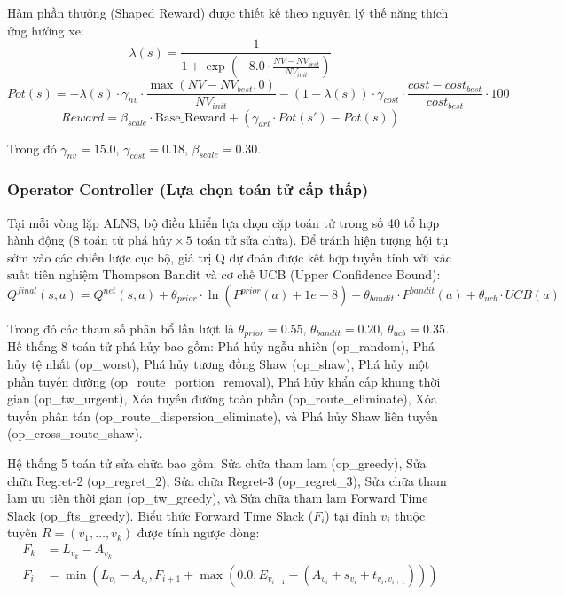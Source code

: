 \documentclass[13pt,a4paper]{extarticle}
\begin{document}
Hàm phần thưởng (Shaped Reward) được thiết kế theo nguyên lý thế năng thích ứng hướng xe:
\begin{equation}
\lambda(s) = \frac{1}{1 + \exp\left(-8.0 \cdot \frac{NV - NV_{best}}{NV_{init}}\right)}
\end{equation}
\begin{equation}
Pot(s) = - \lambda(s) \cdot \gamma_{nv} \cdot \frac{\max(NV - NV_{best}, 0)}{NV_{init}} - (1 - \lambda(s)) \cdot \gamma_{cost} \cdot \frac{cost - cost_{best}}{cost_{best}} \cdot 100
\end{equation}
\begin{equation}
Reward = \beta_{scale} \cdot \text{Base\_Reward} + \left( \gamma_{drl} \cdot Pot(s') - Pot(s) \right)
\end{equation}

Trong đó $\gamma_{nv} = 15.0$, $\gamma_{cost} = 0.18$, $\beta_{scale} = 0.30$.

\subsubsection{Operator Controller (Lựa chọn toán tử cấp thấp)}

Tại mỗi vòng lặp ALNS, bộ điều khiển lựa chọn cặp toán tử trong số 40 tổ hợp hành động ($8 \text{ toán tử phá hủy} \times 5 \text{ toán tử sửa chữa}$). Để tránh hiện tượng hội tụ sớm vào các chiến lược cục bộ, giá trị Q dự đoán được kết hợp tuyến tính với xác suất tiên nghiệm Thompson Bandit và cơ chế UCB (Upper Confidence Bound):
\begin{equation}
Q^{final}(s, a) = Q^{net}(s, a) + \theta_{prior} \cdot \ln(P^{prior}(a) + 1e-8) + \theta_{bandit} \cdot P^{bandit}(a) + \theta_{ucb} \cdot UCB(a)
\end{equation}

Trong đó các tham số phân bổ lần lượt là $\theta_{prior} = 0.55$, $\theta_{bandit} = 0.20$, $\theta_{ucb} = 0.35$.
Hế thống 8 toán tử phá hủy bao gồm: Phá hủy ngẫu nhiên (op\_random), Phá hủy tệ nhất (op\_worst), Phá hủy tương đồng Shaw (op\_shaw), Phá hủy một phần tuyến đường (op\_route\_portion\_removal), Phá hủy khẩn cấp khung thời gian (op\_tw\_urgent), Xóa tuyến đường toàn phần (op\_route\_eliminate), Xóa tuyến phân tán (op\_route\_dispersion\_eliminate), và Phá hủy Shaw liên tuyến (op\_cross\_route\_shaw).
\clearpage

Hệ thống 5 toán tử sửa chữa bao gồm: Sửa chữa tham lam (op\_greedy), Sửa chữa Regret-2 (op\_regret\_2), Sửa chữa Regret-3 (op\_regret\_3), Sửa chữa tham lam ưu tiên thời gian (op\_tw\_greedy), và Sửa chữa tham lam Forward Time Slack (op\_fts\_greedy).
Biểu thức Forward Time Slack ($F_i$) tại đỉnh $v_i$ thuộc tuyến $R = (v_1, \dots, v_k)$ được tính ngược dòng:
\begin{align}
F_k &= L_{v_k} - A_{v_k} \\
F_i &= \min\left( L_{v_i} - A_{v_i}, F_{i+1} + \max(0.0, E_{v_{i+1}} - (A_{v_i} + s_{v_i} + t_{v_i, v_{i+1}})) \right)
\end{align}
\end{document}

